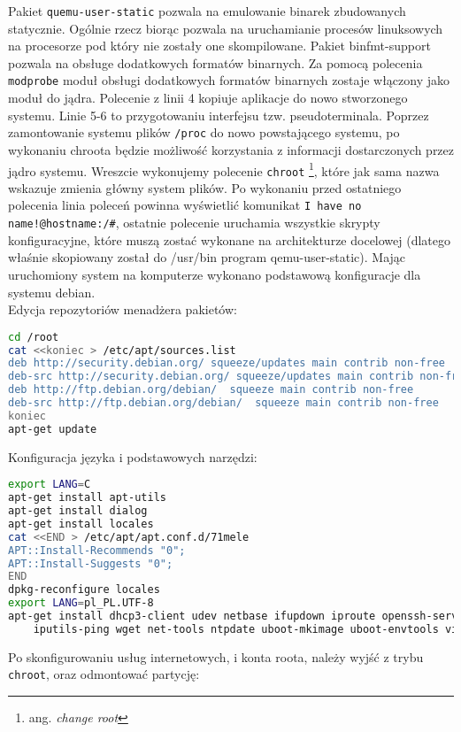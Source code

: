 Pakiet \lstinline|quemu-user-static| pozwala na emulowanie binarek zbudowanych statycznie. Ogólnie rzecz biorąc pozwala na uruchamianie procesów linuksowych na procesorze pod który nie zostały one skompilowane. Pakiet binfmt-support pozwala na obsługe dodatkowych formatów binarnych. Za pomocą polecenia \lstinline|modprobe| moduł obsługi dodatkowych formatów binarnych zostaje włączony jako moduł do jądra. Polecenie z linii 4 kopiuje aplikacje do nowo stworzonego systemu. Linie 5-6 to przygotowaniu interfejsu tzw. pseudoterminala. Poprzez zamontowanie systemu plików \lstinline|/proc| do nowo powstającego systemu, po wykonaniu chroota będzie możliwość korzystania z informacji dostarczonych przez jądro systemu. Wreszcie wykonujemy polecenie \lstinline|chroot| \footnote{ang. \emph{change root}}, które jak sama nazwa wskazuje zmienia główny system plików. Po wykonaniu przed ostatniego polecenia linia poleceń powinna wyświetlić komunikat \lstinline|I have no name!@hostname:/#|, ostatnie polecenie uruchamia wszystkie skrypty konfiguracyjne, które muszą zostać wykonane na architekturze docelowej (dlatego właśnie skopiowany został do /usr/bin program qemu-user-static). Mając uruchomiony system na komputerze wykonano podstawową konfiguracje dla systemu debian.
\\
Edycja repozytoriów menadżera pakietów:
\begin{lstlisting}[language=bash]
cd /root
cat <<koniec > /etc/apt/sources.list
deb http://security.debian.org/ squeeze/updates main contrib non-free
deb-src http://security.debian.org/ squeeze/updates main contrib non-free
deb http://ftp.debian.org/debian/  squeeze main contrib non-free
deb-src http://ftp.debian.org/debian/  squeeze main contrib non-free
koniec
apt-get update
\end{lstlisting}

Konfiguracja języka i podstawowych narzędzi:
\begin{lstlisting}[language=bash]
export LANG=C
apt-get install apt-utils
apt-get install dialog
apt-get install locales
cat <<END > /etc/apt/apt.conf.d/71mele
APT::Install-Recommends "0";
APT::Install-Suggests "0";
END
dpkg-reconfigure locales
export LANG=pl_PL.UTF-8
apt-get install dhcp3-client udev netbase ifupdown iproute openssh-server \
    iputils-ping wget net-tools ntpdate uboot-mkimage uboot-envtools vim nano less X
\end{lstlisting}

Po skonfigurowaniu usług internetowych, i konta roota, należy wyjść z trybu \lstinline|chroot|, oraz odmontować partycję:

